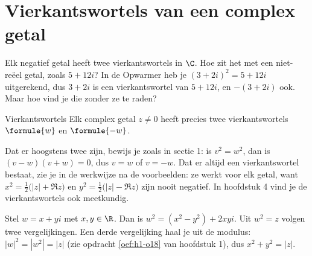 \begin{oefeningen}

\end{oefeningen}

\section{Vierkantswortels van een complex getal}

Elk negatief getal heeft twee vierkantswortels in $\C$. Hoe zit het met een niet-reëel getal, zoals $5 + 12i$? In de Opwarmer heb je $(3 + 2i)^2 = 5 + 12i$ uitgerekend, dus $3 + 2i$ is een vierkantswortel van $5 + 12i$, en $-(3 + 2i)$ ook. Maar hoe vind je die zonder ze te raden?

\begin{theorie}
\begin{stelling}{Vierkantswortels}
Elk complex getal $z \neq 0$ heeft precies twee vierkantswortels $\formule{w}$ en $\formule{-w}$.
\end{stelling}
\end{theorie}

Dat er hoogstens twee zijn, bewijs je zoals in sectie 1: is $v^2 = w^2$, dan is $(v - w)(v + w) = 0$, dus $v = w$ of $v = -w$. Dat er altijd een vierkantswortel bestaat, zie je in de werkwijze na de voorbeelden: ze werkt voor elk getal, want $x^2 = \frac12\bigl(|z| + \Re z\bigr)$ en $y^2 = \frac12\bigl(|z| - \Re z\bigr)$ zijn nooit negatief. In hoofdstuk 4 vind je de vierkantswortels ook meetkundig.

Stel $w = x + yi$ met $x, y \in \R$. Dan is $w^2 = (x^2 - y^2) + 2xyi$. Uit $w^2 = z$ volgen twee vergelijkingen. Een derde vergelijking haal je uit de modulus: $|w|^2 = |w^2| = |z|$ (zie opdracht \ref{oef:h1-o18} van hoofdstuk 1), dus $x^2 + y^2 = |z|$.


